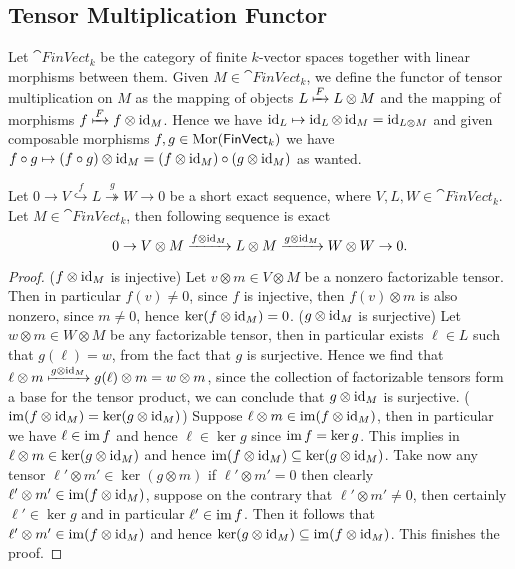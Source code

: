 \subsection{Tensor Multiplication Functor}

\begin{definition}
  Let \(\cat{FinVect}_k\) be the category of finite \(k\)-vector spaces together
  with linear morphisms between them. Given \(M \in \cat{FinVect}_k\), we define
  the functor of tensor multiplication on \(M\) as the mapping of objects \(L
  \xmapsto F L \otimes M\) and the mapping of morphisms \(f \xmapsto F f \otimes
  \operatorname{id}_M\). Hence we have \(\operatorname{id}_L \mapsto \operatorname{id}_L \otimes \operatorname{id}_M = \operatorname{id}_{L \otimes
  M}\) and given composable morphisms \(f, g \in \operatorname{Mor}(\mathsf{FinVect}_k)\) we have
  \(f \circ g \mapsto (f \circ g) \otimes \operatorname{id}_M = (f \otimes \operatorname{id}_M) \circ (g
  \otimes \operatorname{id}_M)\) as wanted.
\end{definition}

\begin{proposition}[Exactness]
  Let \(0 \to V \overset{f}\hookrightarrow L \overset{g}\twoheadrightarrow W \to
  0\) be a short exact sequence, where \(V, L, W \in \cat{FinVect}_k\). Let \(M
  \in \cat{FinVect}_k\), then following sequence is exact
  \[
    0 \to V \otimes M \xrightarrow{f \otimes \operatorname{id}_M}
    L \otimes M \xrightarrow{g \otimes \operatorname{id}_M} W \otimes W \to 0.
  \]
\end{proposition}

\begin{proof}
  (\(f \otimes \operatorname{id}_M\) is injective) Let \(v \otimes m \in V \otimes M\) be a
  nonzero factorizable tensor. Then in particular \(f(v) \neq 0\), since \(f\)
  is injective, then \(f(v) \otimes m\) is also nonzero, since \(m \neq 0\),
  hence \(\ker(f \otimes \operatorname{id}_M) = 0\). (\(g \otimes \operatorname{id}_M\) is surjective) Let
  \(w \otimes m \in W \otimes M\) be any factorizable tensor, then in particular
  exists \(\ell \in L\) such that \(g(\ell) = w\), from the fact that \(g\) is
  surjective. Hence we find that \(\ell \otimes m \xmapsto{g \otimes \operatorname{id}_M}
  g(\ell) \otimes m = w \otimes m\), since the collection of factorizable
  tensors form a base for the tensor product, we can conclude that \(g \otimes
  \operatorname{id}_M\) is surjective. (\(\operatorname{im}(f \otimes \operatorname{id}_M) = \ker(g \otimes \operatorname{id}_M)\))
  Suppose \(\ell \otimes m \in \operatorname{im}(f \otimes \operatorname{id}_M)\), then in particular we
  have \(\ell \in \operatorname{im} f\) and hence \(\ell \in \ker g\) since \(\operatorname{im} f = \ker
  g\). This implies in \(\ell \otimes m \in \ker(g \otimes \operatorname{id}_M)\) and hence
  \(\operatorname{im}(f \otimes \operatorname{id}_M) \subseteq \ker(g \otimes \operatorname{id}_M)\). Take now any tensor
  \(\ell' \otimes m' \in \ker(g \otimes m)\) if \(\ell' \otimes m' = 0\) then
  clearly  \(\ell' \otimes m' \in \operatorname{im}(f \otimes \operatorname{id}_M)\), suppose on the
  contrary that \(\ell' \otimes m' \neq 0\), then certainly \(\ell' \in \ker g\)
  and in particular \(\ell' \in \operatorname{im} f\). Then it follows that \(\ell' \otimes m'
  \in \operatorname{im}(f \otimes \operatorname{id}_M)\) and hence \(\ker(g \otimes \operatorname{id}_M) \subseteq \operatorname{im}(f
  \otimes \operatorname{id}_M)\). This finishes the proof.
\end{proof}

